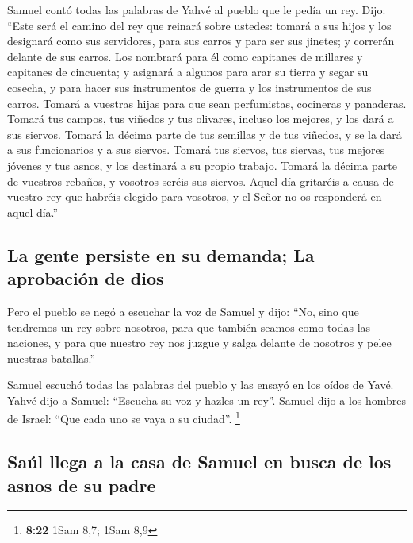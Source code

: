  Samuel contó todas las palabras de Yahvé al pueblo que
le pedía un rey.  Dijo: ``Este será el camino del rey que
reinará sobre ustedes: tomará a sus hijos y los designará como sus
servidores, para sus carros y para ser sus jinetes; y correrán delante
de sus carros.  Los nombrará para él como capitanes de
millares y capitanes de cincuenta; y asignará a algunos para arar su
tierra y segar su cosecha, y para hacer sus instrumentos de guerra y los
instrumentos de sus carros.  Tomará a vuestras hijas para
que sean perfumistas, cocineras y panaderas.  Tomará tus
campos, tus viñedos y tus olivares, incluso los mejores, y los dará a
sus siervos.  Tomará la décima parte de tus semillas y de
tus viñedos, y se la dará a sus funcionarios y a sus siervos.
 Tomará tus siervos, tus siervas, tus mejores jóvenes y
tus asnos, y los destinará a su propio trabajo.  Tomará
la décima parte de vuestros rebaños, y vosotros seréis sus siervos.
 Aquel día gritaréis a causa de vuestro rey que habréis
elegido para vosotros, y el Señor no os responderá en aquel día.''

\hypertarget{la-gente-persiste-en-su-demanda-la-aprobaciuxf3n-de-dios}{%
\subsection{La gente persiste en su demanda; La aprobación de
dios}\label{la-gente-persiste-en-su-demanda-la-aprobaciuxf3n-de-dios}}

 Pero el pueblo se negó a escuchar la voz de Samuel y
dijo: ``No, sino que tendremos un rey sobre nosotros, 
para que también seamos como todas las naciones, y para que nuestro rey
nos juzgue y salga delante de nosotros y pelee nuestras batallas.''

 Samuel escuchó todas las palabras del pueblo y las
ensayó en los oídos de Yavé.  Yahvé dijo a Samuel:
``Escucha su voz y hazles un rey''. Samuel dijo a los hombres de Israel:
``Que cada uno se vaya a su ciudad''. \footnote{\textbf{8:22} 1Sam 8,7;
  1Sam 8,9}

\hypertarget{sauxfal-llega-a-la-casa-de-samuel-en-busca-de-los-asnos-de-su-padre}{%
\subsection{Saúl llega a la casa de Samuel en busca de los asnos de su
padre}\label{sauxfal-llega-a-la-casa-de-samuel-en-busca-de-los-asnos-de-su-padre}}

